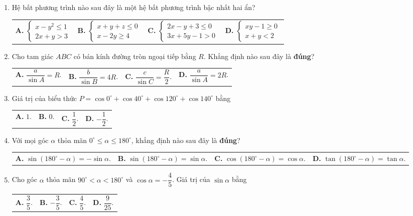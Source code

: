 \documentclass[12pt,a4paper]{article}
\makeatletter
\newcommand{\four}[4]{\par\noindent\begin{tabularx}{\linewidth}{@{}*{4}{>{\raggedright\arraybackslash}X}@{}}\textbf{A.} #1&\textbf{B.} #2&\textbf{C.} #3&\textbf{D.} #4\end{tabularx}}
\makeatother
\begin{document}
\begin{enumerate}
\item Hệ bất phương trình nào sau đây là một hệ bất phương trình bậc nhất hai ẩn?
\four{$\begin{cases} x - y^2 \le 1 \\ 2x + y > 3 \end{cases}$}{$\begin{cases} x + y + z \le 0 \\ x - 2y \ge 4 \end{cases}$}{$\begin{cases} 2x - y + 3 \le 0 \\ 3x + 5y - 1 > 0 \end{cases}$}{$\begin{cases} xy - 1 \ge 0 \\ x + y < 2 \end{cases}$}

\item Cho tam giác $ABC$ có bán kính đường tròn ngoại tiếp bằng $R$. Khẳng định nào sau đây là \textbf{đúng}?
\four{$\dfrac{a}{\sin A} = R$.}{$\dfrac{b}{\sin B} = 4R$.}{$\dfrac{c}{\sin C} = \dfrac{R}{2}$.}{$\dfrac{a}{\sin A} = 2R$.}

\item Giá trị của biểu thức $P = \cos 0^\circ + \cos 40^\circ + \cos 120^\circ + \cos 140^\circ$ bằng
\four{$1$.}{$0$.}{$\dfrac{1}{2}$.}{$-\dfrac{1}{2}$.}

\item Với mọi góc $\alpha$ thỏa mãn $0^\circ \le \alpha \le 180^\circ$, khẳng định nào sau đây là \textbf{đúng}?
\four{$\sin(180^\circ - \alpha) = -\sin \alpha$.}{$\sin(180^\circ - \alpha) = \sin \alpha$.}{$\cos(180^\circ - \alpha) = \cos \alpha$.}{$\tan(180^\circ - \alpha) = \tan \alpha$.}

\item Cho góc $\alpha$ thỏa mãn $90^\circ < \alpha < 180^\circ$ và $\cos \alpha = -\dfrac{4}{5}$. Giá trị của $\sin \alpha$ bằng
\four{$\dfrac{3}{5}$.}{$-\dfrac{3}{5}$.}{$\dfrac{4}{5}$.}{$\dfrac{9}{25}$.}
\end{enumerate}
\end{document}
